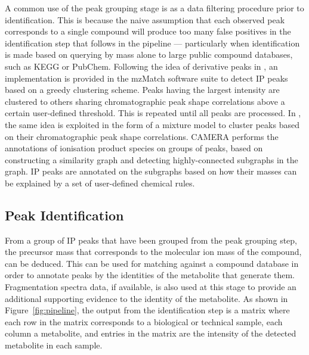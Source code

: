 A common use of the peak grouping stage is as a data filtering procedure prior to identification. This is because the naive assumption that each observed peak corresponds to a single compound will produce too many false positives in the identification step that follows in the pipeline --- particularly when identification is made based on querying by mass alone to large public compound databases, such as KEGG or PubChem. Following the idea of derivative peaks in \cite{Scheltema2009a}, an implementation is provided in the mzMatch software suite \cite{Scheltema2011} to detect IP peaks based on a greedy clustering scheme. Peaks having the largest intensity are clustered to others sharing chromatographic peak shape correlations above a certain user-defined threshold. This is repeated until all peaks are processed. In \cite{Rogers2012}, the same idea is exploited in the form of a mixture model to cluster peaks based on their chromatographic peak shape correlations. CAMERA \cite{Kuhl2012} performs the annotations of ionisation product species on groups of peaks, based on constructing a similarity graph and detecting highly-connected subgraphs in the graph. IP peaks are annotated on the subgraphs based on how their masses can be explained by a set of user-defined chemical rules. 


\subsection{Peak Identification\label{sub:identification-background}}

From a group of IP peaks that have been grouped from the peak grouping step, the precursor mass that corresponds to the molecular ion mass of the compound, can be deduced. This can be used for matching against a compound database in order to annotate peaks by the identities of the metabolite that generate them. Fragmentation spectra data, if available, is also used at this stage to provide an additional supporting evidence to the identity of the metabolite. As shown in Figure~\ref{fig:pipeline}, the output from the identification step is a matrix where each row in the matrix corresponds to a biological or technical sample, each column a metabolite, and entries in the matrix are the intensity of the detected metabolite in each sample. 

